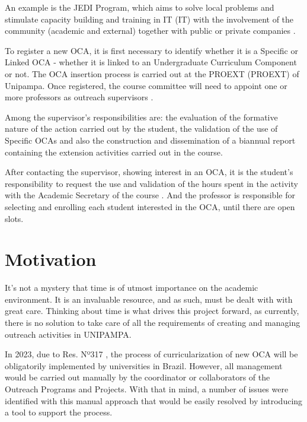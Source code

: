 An example is the JEDI Program, which aims to solve local problems and stimulate capacity building and training in \acl{IT} (\ac{IT}) with the involvement of the community (academic and external) together with public or private companies \cite{chamadaJedi}.

To register a new \acl{OCA}, it is first necessary to identify whether it is a Specific or Linked \ac{OCA} - whether it is linked to an Undergraduate Curriculum Component or not. The \ac{OCA} insertion process is carried out at the \acl{PROEXT} (\ac{PROEXT}) of Unipampa. Once registered, the course committee will need to appoint one or more professors as outreach supervisors \cite{res317}.

Among the supervisor's responsibilities are: the evaluation of the formative nature of the action carried out by the student, the validation of the use of Specific \acp{OCA} and also the construction and dissemination of a biannual report containing the extension activities carried out in the course.

After contacting the supervisor, showing interest in an \ac{OCA}, it is the student's responsibility to request the use and validation of the hours spent in the activity with the Academic Secretary of the course \cite{res317}. And the professor is responsible for selecting and enrolling each student interested in the \ac{OCA}, until there are open slots.

\section{Motivation}\label{sec:motivation}

It's not a mystery that time is of utmost importance on the academic environment. It is an invaluable resource, and as such, must be dealt with with great care. Thinking about time is what drives this project forward, as currently, there is no solution to take care of all the requirements of creating and managing outreach activities in \ac{UNIPAMPA}.

In 2023, due to Res. Nº317 \cite{res317}, the process of curricularization of new \acl{OCA} will be obligatorily implemented by universities in Brazil. However, all management would be carried out manually by the coordinator or collaborators of the Outreach Programs and Projects. With that in mind, a number of issues were identified with this manual approach that would be easily resolved by introducing a tool to support the process.

